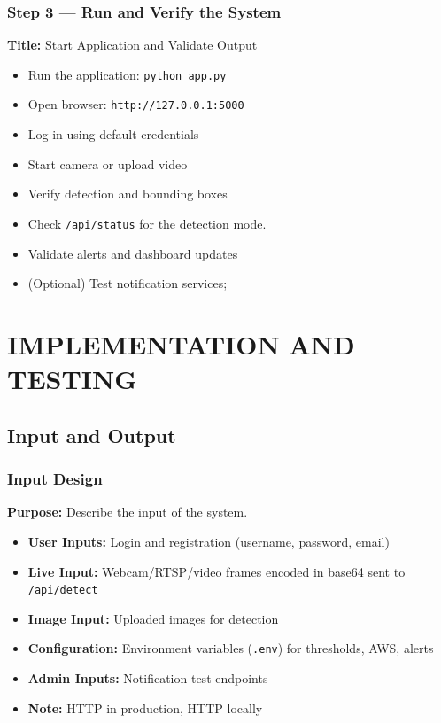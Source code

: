 \documentclass[10pt,openany]{report}
\begin{document}
\begin{sloppypar}
{{{\begin{sloppypar}
\subsection{Step 3 — Run and Verify the System}
\textbf{Title:} Start Application and Validate Output

\begin{itemize}
    \item Run the application:
    \texttt{python app.py}
    \item Open browser:
    \texttt{http://127.0.0.1:5000}
    \item Log in using default credentials
    \item Start camera or upload video
    \item Verify detection and bounding boxes
    \item Check \texttt{/api/status} for the detection mode.
    \item Validate alerts and dashboard updates
    \item (Optional) Test notification services;
\end{itemize}

\newpage
\chapter{IMPLEMENTATION AND TESTING}
\linespread{1.5}
\section{Input and Output}

\subsection{Input Design}
\textbf{Purpose:} Describe the input of the system.

\begin{itemize}
    \item \textbf{User Inputs:} Login and registration (username, password, email)
    \item \textbf{Live Input:} Webcam/RTSP/video frames encoded in base64 sent to \texttt{/api/detect}
    \item \textbf{Image Input:} Uploaded images for detection
    \item \textbf{Configuration:} Environment variables (\texttt{.env}) for thresholds, AWS, alerts
    \item \textbf{Admin Inputs:} Notification test endpoints
    \item \textbf{Note:} HTTP in production, HTTP locally
\end{itemize}


\end{sloppypar}}}}
\end{sloppypar}
\end{document}
